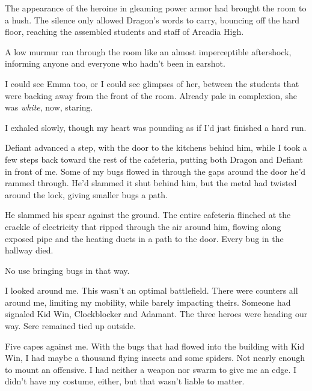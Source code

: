 





The appearance of the heroine in gleaming power armor had brought the room to a hush.  The silence only allowed Dragon's words to carry, bouncing off the hard floor, reaching the assembled students and staff of Arcadia High.



A low murmur ran through the room like an almost imperceptible aftershock, informing anyone and everyone who hadn't been in earshot.



I could see Emma too, or I could see glimpses of her, between the students that were backing away from the front of the room.  Already pale in complexion, she was \emph{white}, now, staring.



I exhaled slowly, though my heart was pounding as if I'd just finished a hard run.



Defiant advanced a step, with the door to the kitchens behind him, while I took a few steps back toward the rest of the cafeteria, putting both Dragon and Defiant in front of me.  Some of my bugs flowed in through the gaps around the door he'd rammed through.  He'd slammed it shut behind him, but the metal had twisted around the lock, giving smaller bugs a path.



He slammed his spear against the ground.  The entire cafeteria flinched at the crackle of electricity that ripped through the air around him, flowing along exposed pipe and the heating ducts in a path to the door.  Every bug in the hallway died.



No use bringing bugs in that way.



I looked around me.  This wasn't an optimal battlefield.  There were counters all around me, limiting my mobility, while barely impacting theirs.  Someone had signaled Kid Win, Clockblocker and Adamant.  The three heroes were heading our way.  Sere remained tied up outside.



Five capes against me.  With the bugs that had flowed into the building with Kid Win, I had maybe a thousand flying insects and some spiders.  Not nearly enough to mount an offensive.  I had neither a weapon nor swarm to give me an edge.  I didn't have my costume, either, but that wasn't liable to matter.



